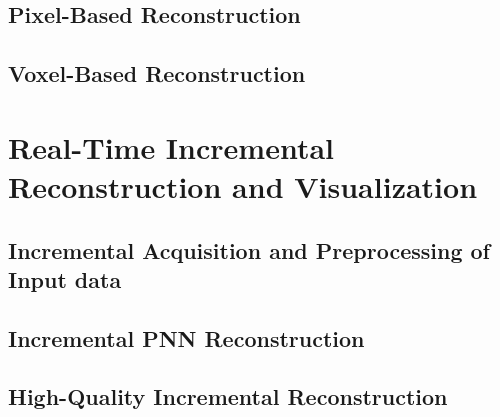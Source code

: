 \documentclass[12pt, twoside, a4paper]{book}
\begin{document}
	\section{Pixel-Based Reconstruction}
		\label{section:non-incremental_pnn}
	
		
	
	\section{Voxel-Based Reconstruction}
		\label{section:non-incremental_vnn}
	
		
	
\chapter{Real-Time Incremental Reconstruction and Visualization}
	\label{chapter:incremental_reconstruction_visualization}
	
	
	
	\section{Incremental Acquisition and Preprocessing of Input data}
		
		
	
	\section{Incremental PNN Reconstruction}
	
		
	
	\section{High-Quality Incremental Reconstruction}
		\label{section:incremental_hq}
	
		
	
\end{document}
